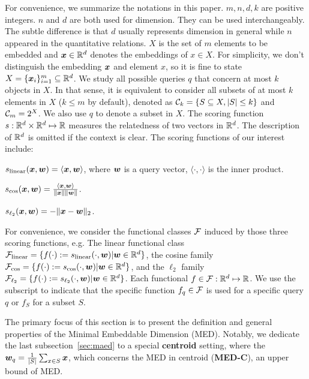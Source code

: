 \documentclass[10pt]{article}
\begin{document}
For convenience, we summarize the notations in this paper.
$m, n, d, k$ are positive integers. $n$ and $d$ are both used for dimension. They can be used interchangeably. The subtle difference is that $d$ usually represents dimension in general while $n$ appeared in the quantitative relations. $X$ is the set of $m$ elements to be embedded and $\bm{x} \in \mathbb{R}^d$ denotes the embeddings of $x\in X$. For simplicity, we don't distinguish the embedding $\bm{x}$ and element $x$, so it is fine to state $X = \{\bm{x}_i\}_{i=1}^m \subseteq \mathbb{R}^d$.
We study all possible queries $q$ that concern at most $ k$ objects in $X$. In that sense, it is equivalent to consider all subsets of at most $k$ elements in $X$ ($k \leq m$ by default), denoted as $ \mathcal{C}_k=\{S\subseteq X, |S|\leq k\}$ and $\mathcal{C}_m=2^X$. We also use $q$ to denote a subset in $X$.
The scoring function $s: \mathbb{R}^d \times \mathbb{R}^d\mapsto \mathbb{R}$ measures the relatedness of two vectors in $\mathbb{R}^d$. The description of $\mathbb{R}^d$ is omitted if the context is clear. The scoring functions of our interest include:
\begin{compactdesc}
    \item[Linear:] $s_{\rm linear}(\bm{x}, \bm{w}) = \langle \bm{x}, \bm{w}\rangle$, where $\bm{w}$ is a query vector, $\langle \cdot, \cdot\rangle$ is the inner product.
    \item[Cosine similarity:] $s_{\cos}(\bm{x}, \bm{w}) = \frac{\langle \bm{x}, \bm{w} \rangle }{ \|\bm{x}\|\|\bm{w}\|}$.
    \item[Euclidean distance ($\ell_2$):] $s_{\ell_2}(\bm{x}, \bm{w}) = - \|\bm{x} - \bm{w}\|_2 $.
\end{compactdesc}
For convenience, we consider the functional classes $\mathcal{F}$ induced by those three scoring functions, e.g. The linear functional class $\mathcal{F}_{\rm linear} = \{f(\cdot ):= s_{\rm linear}(\cdot, \bm{w}) | \bm{w} \in \mathbb{R}^d\}$, the cosine family$\mathcal{F}_{\cos} = \{  f(\cdot ):= s_{\cos}(\cdot, \bm{w}) | \bm{w} \in \mathbb{R}^d\}$, and the $\ell_2$ family $\mathcal{F}_{\ell_{2}} = \{f(\cdot ):= s_{\ell_2}(\cdot, \bm{w}) | \bm{w} \in \mathbb{R}^d\}$. Each functional $f\in \mathcal{F}: \mathbb{R}^d\mapsto\mathbb{R}$. We use the subscript to indicate that the specific function $f_q\in \mathcal{F}$ is used for a specific query $q$ or $f_S$ for a subset $S$.



The primary focus of this section is to present the definition and general properties of the Minimal Embeddable Dimension (MED). Notably, we dedicate the last subsection~\ref{sec:maed} to a special \textbf{centroid} setting, where the $\bm{w}_q = \frac{1}{|S|} \sum_{x\in S} \bm{x}$, which concerns the MED in centroid (\textbf{MED-C}), an upper bound of MED.
\end{document}
